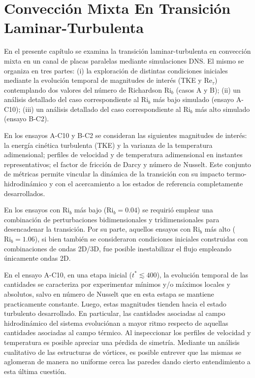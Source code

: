 \chapter{Convección Mixta En Transición Laminar-Turbulenta} \label{cap:transicion}

En el presente capítulo se examina la transición laminar-turbulenta en convección mixta en un canal de placas paralelas mediante simulaciones DNS. El mismo se organiza en tres partes: (i) la exploración de distintas condiciones iniciales mediante la evolución temporal de magnitudes de interés (TKE y Re$_{\tau}$) contemplando dos valores del número de Richardson Ri$_b$ (casos A y B); (ii) un análisis detallado del caso correspondiente al Ri$_b$ más bajo simulado (ensayo A-C10); (iii) un análisis detallado del caso correspondiente al Ri$_b$ más alto simulado (ensayo B-C2).

En los ensayos A-C10 y B-C2 se consideran las siguientes magnitudes de interés: la energía cinética turbulenta (TKE) y la varianza de la temperatura adimensional; perfiles de velocidad y de temperatura adimensional en instantes representativos; el factor de fricción de Darcy y número de Nusselt. Este conjunto de métricas permite vincular la dinámica de la transición con su impacto termo-hidrodinámico y con el acercamiento a los estados de referencia completamente desarrollados.

En los ensayos con Ri$_b$ más bajo ($\text{Ri}_b=0\text{.}04$) se requirió emplear una combinación de perturbaciones bidimensionales y tridimensionales para desencadenar la transición. Por su parte, aquellos ensayos con Ri$_b$ más alto ($\text{Ri}_b=1\text{.}06$), si bien también se consideraron condiciones iniciales construidas con combinaciones de ondas 2D/3D, fue posible inestabilizar el flujo empleando únicamente ondas 2D. 

En el ensayo A-C10, en una etapa inicial ($t^*\lesssim 400$), la evolución temporal de las cantidades se caracteriza por experimentar mínimos y/o máximos locales y absolutos, salvo en número de Nusselt que en esta estapa se mantiene practicamente constante. Luego, estas magnitudes tienden hacia el estado turbulento desarrollado. En particular, las cantidades asociadas al campo hidrodinámico del sistema evoluciónan a mayor ritmo respecto de aquellas cantidades asociadas al campo térmico. Al inspeccionar los perfiles de velocidad y temperatura es posible apreciar una pérdida de simetría. Mediante un análisis cualitativo de las estructuras de vórtices, es posible entrever que las mismas se aglomeran de manera no uniforme cerca las paredes dando cierto entendimiento a esta última cuestión.  

